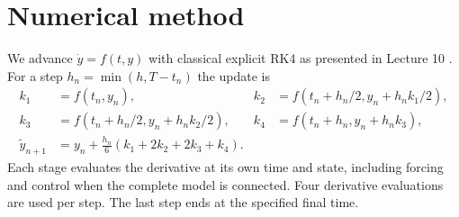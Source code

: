 \section{Numerical method}
We advance $\dot y=f(t,y)$ with classical explicit RK4 as presented in Lecture 10 \cite{goza10}. For a step
$h_n=\min(h,T-t_n)$ the update is
\begin{align}
k_1&=f(t_n,y_n), & k_2&=f(t_n+h_n/2,y_n+h_nk_1/2),\\
k_3&=f(t_n+h_n/2,y_n+h_nk_2/2), & k_4&=f(t_n+h_n,y_n+h_nk_3),\\
\widetilde y_{n+1}&=y_n+\frac{h_n}{6}(k_1+2k_2+2k_3+k_4).
\end{align}
Each stage evaluates the derivative at its own time and state, including
forcing and control when the complete model is connected. Four derivative
evaluations are used per step. The last step ends at the specified final time.

